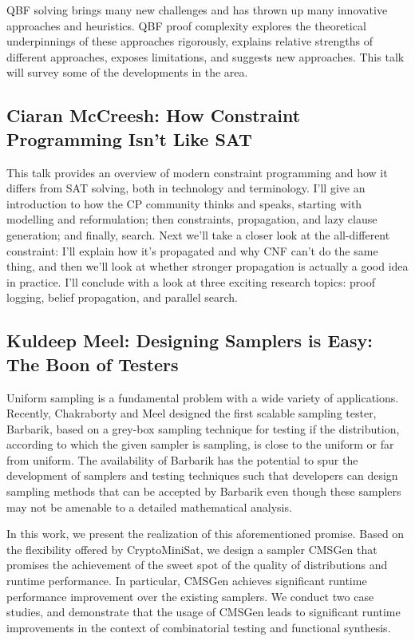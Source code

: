 \documentclass[11pt]{article}
\begin{document}
QBF solving brings many new challenges and has thrown up many innovative approaches and heuristics. QBF proof complexity explores the theoretical underpinnings of these approaches rigorously, explains relative strengths of different approaches, exposes limitations, and suggests new approaches. This talk will survey some of the developments in the area.


\subsection*{Ciaran McCreesh: How Constraint Programming Isn't Like SAT}\label{McCreesh}

This talk provides an overview of modern constraint programming and how it differs from SAT solving, both in technology and terminology. I'll give an introduction to how the CP community thinks and speaks, starting with modelling and reformulation; then constraints, propagation, and lazy clause generation; and finally, search. Next we'll take a closer look at the all-different constraint: I'll explain how it's propagated and why CNF can't do the same thing, and then we'll look at whether stronger propagation is actually a good idea in practice. I'll conclude with a look at three exciting research topics: proof logging, belief propagation, and parallel search.


\subsection*{Kuldeep Meel: Designing Samplers is Easy: The Boon of Testers}\label{Meel}

Uniform sampling is a fundamental problem with a wide variety of applications. Recently, Chakraborty and Meel designed the first scalable sampling tester, Barbarik, based on a grey-box sampling technique for testing if the distribution, according to which the given sampler is sampling, is close to the uniform or far from uniform. The availability of Barbarik has the potential to spur the development of samplers and testing techniques such that developers can design sampling methods that can be accepted by Barbarik even though these samplers may not be amenable to a detailed mathematical analysis.

In this work, we present the realization of this aforementioned promise. Based on the flexibility offered by CryptoMiniSat, we design a sampler CMSGen that promises the achievement of the sweet spot of the quality of distributions and runtime performance. In particular, CMSGen achieves significant runtime performance improvement over the existing samplers. We conduct two case studies, and demonstrate that the usage of CMSGen leads to significant runtime improvements in the context of combinatorial testing and functional synthesis.
\end{document}
